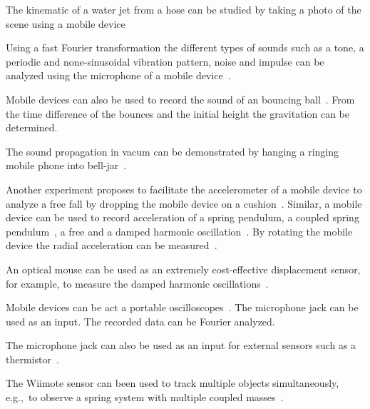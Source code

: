 \documentclass{sigchi}
\newcommand{\eg}{e.g.,\ }
\begin{document}
The kinematic of a water jet from a hose can be studied by taking a photo of the scene using a mobile device~\cite{Falcao2009}


Using a fast Fourier transformation the different types of sounds such as a tone, a periodic and none-sinusoidal vibration pattern, noise and impulse can be analyzed using the microphone of a mobile device~\cite{KuhnAcousticPhenomena2013}.

Mobile devices can also be used to record the sound of an bouncing ball~\cite{Schwarz2013Acoustic}.
From the time difference of the bounces and the initial height the gravitation can be determined.

The sound propagation in vacum can be demonstrated by hanging a ringing mobile phone into bell-jar~\cite{CaleonBellJar2013}.



Another experiment proposes to facilitate the accelerometer of a mobile device to analyze a free fall by dropping the mobile device on a cushion~\cite{VogtFreeFall2012}.
Similar, a mobile device can be used to record acceleration of a spring pendulum, a coupled spring pendulum~\cite{KuhnPendulum2012}, a free and a damped harmonic oscillation~\cite{Castro2013}.
By rotating the mobile device the radial acceleration can be measured~\cite{VogtRadialAcc2013}.



An optical mouse can be used as an extremely cost-effective displacement sensor, for example, to measure the damped harmonic oscillations~\cite{Ng2005}.

Mobile devices can be act a portable oscilloscopes~\cite{Forinash2012}.
The microphone jack can be used as an input.
The recorded data can be Fourier analyzed.

The microphone jack can also be used as an input for external sensors such as a thermistor~\cite{Forinash2012}.

The Wiimote sensor can been used to track multiple objects simultaneously, \eg to observe a spring system with multiple coupled masses~\cite{Skeffington2012}.
\end{document}
